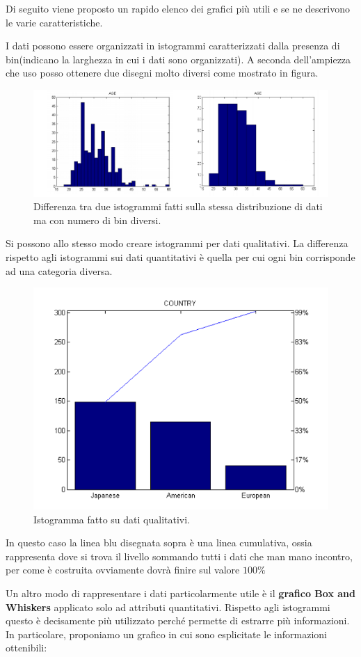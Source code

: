 Di seguito viene proposto un rapido elenco dei grafici più utili e se ne descrivono le varie caratteristiche.

I dati possono essere organizzati in istogrammi caratterizzati dalla presenza di bin(indicano la larghezza in cui i dati sono organizzati). A seconda dell'ampiezza che uso posso ottenere due disegni molto diversi come mostrato in figura.


\begin{figure}[H]
	\centering
	\includegraphics[height=0.35 \linewidth]{introduction/pict/istogramma_quant.png}
	\caption{Differenza tra due istogrammi fatti sulla stessa distribuzione di dati ma con numero di bin diversi.}
\end{figure}


Si possono allo stesso modo creare istogrammi per dati qualitativi. La differenza rispetto agli istogrammi sui dati quantitativi è quella per cui ogni bin corrisponde ad una categoria diversa.

\begin{figure}[H]
	\centering
	\includegraphics[height=0.3 \linewidth]{introduction/pict/istogramma_qual.png}
	\caption{Istogramma fatto su  dati qualitativi.}
\end{figure}

In questo caso la linea blu disegnata sopra è una linea cumulativa, ossia rappresenta dove si trova il livello sommando tutti i dati che man mano incontro, per come è costruita ovviamente dovrà finire sul valore $100\%$


Un altro modo di rappresentare i dati particolarmente utile è il \textbf{grafico Box and Whiskers} applicato solo ad attributi quantitativi. Rispetto agli istogrammi questo è decisamente più utilizzato perché permette di estrarre  più informazioni. In particolare, proponiamo un grafico in cui sono esplicitate le informazioni ottenibili:

